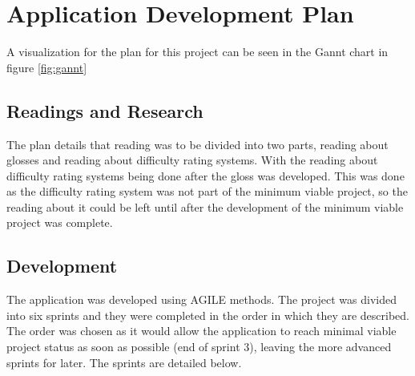 \chapter{Application Development Plan}

A visualization for the plan for this project can be seen in the Gannt chart in figure \ref{fig:gannt}
 

\section{Readings and Research}

The plan details that reading was to be divided into two parts, reading about glosses and reading about difficulty rating systems. With the reading about difficulty rating systems being done after the gloss was developed. This was done as the difficulty rating system was not part of the minimum viable project, so the reading about it could be left until after the development of the minimum viable project was complete.

\section{Development}

The application was developed using AGILE methods. The project was divided into six sprints and they were completed in the order in which they are described. The order was chosen as it would allow the application to reach minimal viable project status as soon as possible (end of sprint 3), leaving the more advanced sprints for later. The sprints are detailed below.

